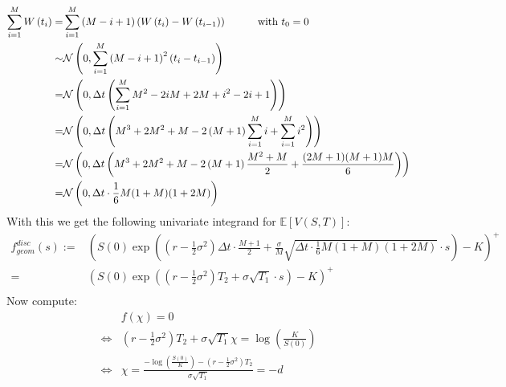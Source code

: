 \documentclass[a4paper,10pt]{article}
\begin{document}
\begin{align*}
 \sum_{i=1}^{M}W\left(t_i\right)=&\sum_{i=1}^{M}\left(M-i+1\right)\left(W\left(t_i\right)-W\left(t_{i-1}\right)\right)\text{ $ $ $ $ $ $ $ $ $ $ $ $ $ $ $ $ with $t_0=0$}\\
 \sim  & \mathcal{N}\left(0, \sum_{i=1}^{M} \left(M-i+1\right)^2 \left(t_i - t_{i-1}\right)\right)\\
 =     & \mathcal{N}\left(0, \Delta t \left(\sum_{i=1}^{M} M^2-2 i M + 2 M + i^2 - 2 i +1\right) \right)\\
 =     & \mathcal{N}\left(0, \Delta t \left( M^3 + 2 M^2 + M - 2 \left(M + 1\right)\sum_{i=1}^{M}i + \sum_{i=1}^{M}i^2 \right) \right)\\
 =     & \mathcal{N}\left(0, \Delta t \left( M^3 + 2 M^2 + M - 2 \left(M + 1\right) \frac{M^2+M}{2} + \frac{(2 M+1) (M + 1) M}{6} \right) \right)\\
 =     & \mathcal{N}\left(0, \Delta t \cdot \frac{1}{6} M(1+M)(1+2M)\right)\\
\end{align*}
With this we get the following univariate integrand for $\mathbb{E}\left[ V\left(S,T\right)\right]$:
\begin{align*}
 f_{geom}^{disc}\left(s\right):=&\left(S(0) \exp\left(\left(r-\frac{1}{2}\sigma^2\right) \Delta t \cdot\frac{M+1}{2}+\frac{\sigma}{M}\sqrt{\Delta t \cdot \frac{1}{6} M(1+M)(1+2M)}\cdot s\right)-K\right)^+\\
 =&\left(S(0) \exp\left(\left(r-\frac{1}{2}\sigma^2\right) T_2+\sigma\sqrt{T_1}\cdot s\right)-K\right)^+\\
\end{align*}
Now compute:
\begin{align*}
 &f\left(\chi\right)=0\\
 \Leftrightarrow& \left(r-\frac{1}{2}\sigma^2\right) T_2+\sigma\sqrt{T_1} \chi = \log \left(\frac{K}{S(0)}\right)\\
 \Leftrightarrow& \chi = \frac{- \log \left(\frac{S(0)}{K}\right)-\left(r-\frac{1}{2}\sigma^2\right)T_2}{\sigma\sqrt{T_1}} = - d\\
\end{align*}
\end{document}
